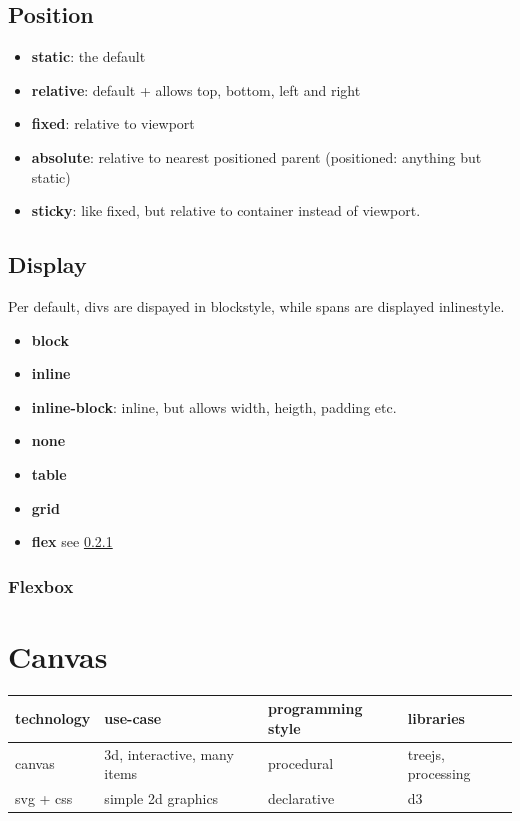 \subsection{Position}
\begin{itemize}
    \item \textbf{static}: the default
    \item \textbf{relative}: default + allows top, bottom, left and right
    \item \textbf{fixed}: relative to viewport
    \item \textbf{absolute}: relative to nearest positioned parent (positioned: anything but static)
    \item \textbf{sticky}: like fixed, but relative to container instead of viewport.
\end{itemize}

\subsection{Display}
Per default, divs are dispayed in blockstyle, while spans are displayed inlinestyle.
\begin{itemize}
    \item \textbf{block}
    \item \textbf{inline}
    \item \textbf{inline-block}: inline, but allows width, heigth, padding etc.
    \item \textbf{none}
    \item \textbf{table}
    \item \textbf{grid}
    \item \textbf{flex} see \ref{flexbox}
\end{itemize}

\subsubsection{Flexbox}\label{flexbox}

\section{Canvas}

\begin{table}[h]
    \begin{tabular}{@{}llll@{}}
    \toprule
    technology & use-case                    & programming style & libraries          \\ 
    \midrule
    canvas     & 3d, interactive, many items & procedural        & treejs, processing \\
    svg + css  & simple 2d graphics          & declarative       & d3                 \\ 
    \bottomrule
    \end{tabular}
    \end{table}